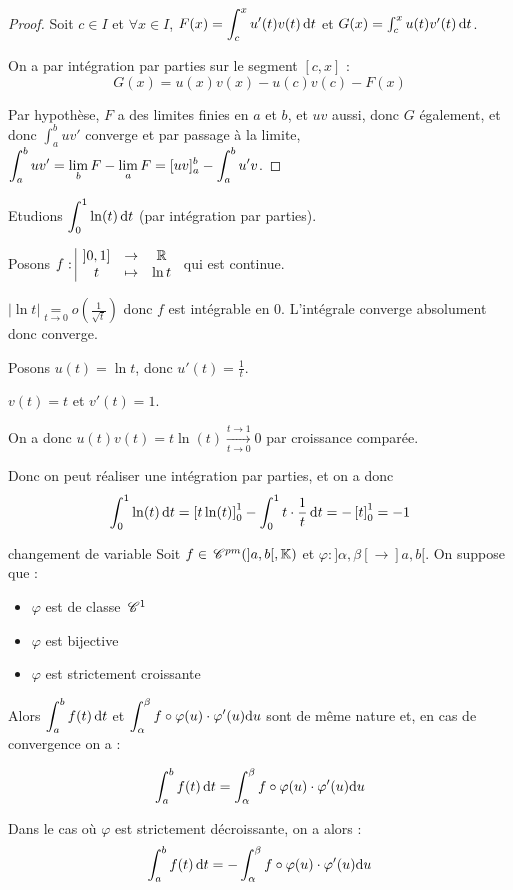\begin{proof}
    Soit $c \in I$ et $\forall x \in I$, $F(x) = \displaystyle \int_c^x u'(t) v(t) \,\mathrm{d}t$ et 
    $G(x) = \int_c^x u(t) v'(t) \,\mathrm{d}t$.

    On a par intégration par parties sur le segment $[c, x]$ :
    $$ G(x) = u(x) v(x) - u(c) v(c) - F(x) $$

    Par hypothèse, $F$ a des limites finies en $a$ et $b$, et $uv$ aussi, donc $G$ également, et donc 
    $\int_{a }^{b } uv'$ converge et par passage à la limite, $\displaystyle \int_{a }^{b } uv' = \lim_b F - \lim_a F = [uv]_a^b - \int_a^b u'v$.
\end{proof}

\begin{exemple}
    Etudions $\displaystyle \int_{0}^{1 } \ln(t) \,\mathrm{d}t$ (par intégration par parties).

    Posons $f: \space \begin{array}{|ccc} \displaystyle ]0, 1] & \to & \displaystyle \mathbb{R} \\ \displaystyle t & \mapsto & \displaystyle \ln t \end{array}$ qui est continue. 

    $|\ln t | \underset{t \to 0}{=} o \left( \frac 1 {\sqrt t} \right)$ donc $f$ est intégrable en $0$.
    L'intégrale converge absolument donc converge. 

    Posons $u(t) = \ln t$, donc $u'(t) = \frac 1 t$.

    $v(t) = t$ et $v'(t) = 1$.

    On a donc $u(t) v(t) = t \ln (t) \xrightarrow[t \to 0]{t \to 1} 0$ par croissance comparée.

    Donc on peut réaliser une intégration par parties, et on a donc 
    $$\displaystyle \int_{0}^{1} \ln(t) \,\mathrm{d}t = \left[ t \ln (t) \right]_0^1 - \int_0^1 t \cdot \frac 1 t \,\mathrm{d}t = - \left[ t \right]_0^1 = -1$$
\end{exemple}

\begin{theoreme}{changement de variable}{}
    Soit $f \in \,\mathscr C^{pm} (]a, b[, \mathbb{K})$ et $\varphi : ]\alpha, \beta[ \to ]a, b[$. 
    On suppose que : 
    \begin{itemize}
        \item $\varphi$ est de classe $\,\mathscr C^{1}$ 
        \item $\varphi$ est bijective
        \item $\varphi$ est strictement croissante
    \end{itemize}

    Alors $\displaystyle \int_{a }^{b } f(t) \,\mathrm{d}t$ et $\displaystyle \int_{\alpha }^{\beta } f \circ \varphi(u) \cdot \varphi'(u) \mathrm d u$ 
    sont de même nature et, en cas de convergence on a :
    
    $$\displaystyle \int_{a }^{b } f(t) \,\mathrm{d}t = \displaystyle \int_{\alpha }^{\beta } f \circ \varphi(u) \cdot \varphi'(u) \mathrm d u$$

    Dans le cas où $\varphi$ est strictement décroissante, on a alors : 
    $$\displaystyle \int_{a }^{b } f(t) \,\mathrm{d}t = - \displaystyle \int_{\alpha }^{\beta } f \circ \varphi(u) \cdot \varphi'(u) \mathrm d u$$
\end{theoreme}

